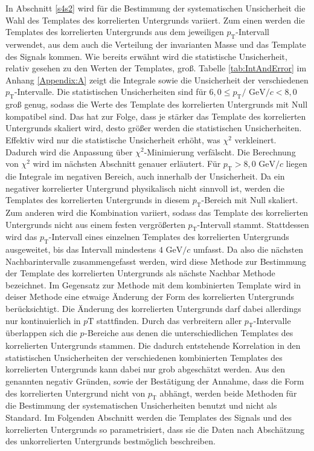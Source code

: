 In Abschnitt \ref{s4s2} wird für die Bestimmung der systematischen Unsicherheit die Wahl des Templates des korrelierten Untergrunds variiert.
\newline
Zum einen werden die Templates des korrelierten Untergrunds aus dem jeweiligen $p_\text{T}$-Intervall verwendet, aus dem auch die Verteilung der invarianten Masse und das Template des Signals kommen.
Wie bereits erwähnt wird die statistische Unsicherheit, relativ gesehen zu den Werten der Templates, groß.
Tabelle \ref{tab:IntAndError} im Anhang \ref{Appendix:A} zeigt die Integrale sowie die Unsicherheit der verschiedenen $p_\text{T}$-Intervalle.
Die statistischen Unsicherheiten sind für $6,0 \leq p_\text{T}/\text{ GeV}/c < 8,0 $ groß genug, sodass die Werte des Template des korrelierten Untergrunds mit Null kompatibel sind.
Das hat zur Folge, dass je stärker das Template des korrelierten Untergrunds skaliert wird, desto größer werden die statistischen Unsicherheiten.
Effektiv wird nur die statistische Unsicherheit erhöht, was $\chi^{2}$ verkleinert.
Dadurch wird die Anpassung über $\chi^{2}$-Minimierung verfälscht.
Die Berechnung von $\chi^{2}$ wird im nächsten Abschnitt genauer erläutert.
\newline
Für $p_\text{T} > 8,0 \text{ GeV}/c$ liegen die Integrale im negativen Bereich, auch innerhalb der Unsicherheit.
Da ein negativer korrelierter Untergrund physikalisch nicht sinnvoll ist, werden die Templates des korrelierten Untergrunds in diesem $p_\text{T}$-Bereich mit Null skaliert.
\newline
Zum anderen wird die Kombination variiert, sodass das Template des korrelierten Untergrunds nicht aus einem festen vergrößerten $p_\text{T}$-Intervall stammt.
Stattdessen wird das $p_\text{T}$-Intervall eines einzelnen Templates des korrelierten Untergrunds ausgeweitet, bis das Intervall mindestens $4\text{ GeV}/c$ umfasst.
Da also die nächsten Nachbarintervalle zusammengefasst werden, wird diese Methode zur Bestimmung der Template des korrelierten Untergrunds als nächste Nachbar Methode bezeichnet.
Im Gegensatz zur Methode mit dem kombinierten Template wird in deiser Methode eine etwaige Änderung der Form des korrelierten Untergrunds berücksichtigt.
Die Änderung des korrelierten Untergrunds darf dabei allerdings nur kontinuierlich in $p\text{T}$ stattfinden.
Durch das verbreitern aller $p_\text{T}$-Intervalle überlappen sich die $p_\text{}$-Bereiche aus denen die unterschiedlichen Templates des korrelierten Untergrunds stammen.
Die dadurch entstehende Korrelation in den statistischen Unsicherheiten der verschiedenen kombinierten Templates des korrelierten Untergrunds kann dabei nur grob abgeschätzt werden. 
\newline
Aus den genannten negativ Gründen, sowie der Bestätigung der Annahme, dass die Form des korrelierten Untergrund nicht von $p_\text{T}$ abhängt, werden beide Methoden für die Bestimmung der systematischen Unsicherheiten benutzt und nicht als Standard.
\newline
Im Folgenden Abschnitt werden die Templates des Signals und des korrelierten Untergrunds so parametrisiert, dass sie die Daten nach Abschätzung des unkorrelierten Untergrunds bestmöglich beschreiben.